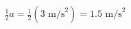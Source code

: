 \documentclass[preview]{standalone}
\begin{document}
\begin{align*}
\frac{1}{2}a = \frac{1}{2}(3 \text{ m/s}^2) = 1.5 \text{ m/s}^2
\end{align*}
\end{document}
